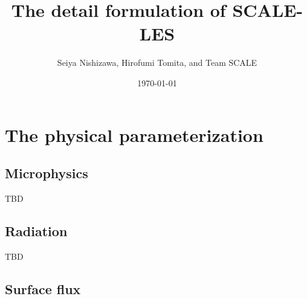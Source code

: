 \documentclass[a4paper]{report}
\title{{\LARGE The detail formulation of SCALE-LES}}
\author{Seiya Nishizawa, Hirofumi Tomita, and Team SCALE}
\date{\today}
\begin{document}
\maketitle
\tableofcontents











\chapter{The physical parameterization}


\section{Microphysics}
{\Huge TBD}

\section{Radiation}
{\Huge TBD}

\section{Surface flux}





\appendix






\end{document}
